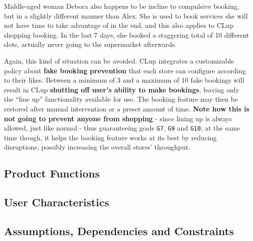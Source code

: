 Middle-aged woman Debora also happens to be incline to \guillemotleft compulsive booking\guillemotright, but in a slightly different manner than Alex. \newline
She is used to book services she will not have time to take advantage of in the end, and this also applies to CLup shopping booking. In the last 7 days, she booked a staggering total of 10 different slots, actually never going to the supermarket afterwards.

Again, this kind of situation can be avoided. CLup integrates a customizable policy about \textbf{fake booking prevention} that each store can configure according to their likes. \newline
Between a minimum of 3 and a maximum of 10 fake bookings will result in CLup \textbf{shutting off user's ability to make bookings}, leaving only the ``line up'' functionality available for use. The booking feature may then be restored after manual intervention or a preset amount of time. \newline
\textbf{Note how this is not going to prevent anyone from shopping} - since lining up is always allowed, just like normal - thus guaranteeing goals \texttt{G7}, \texttt{G9} and \texttt{G10}; at the same time though, it helps the booking feature works at its best by reducing disruptions, possibly increasing the overall stores' throughput.

\subsection{Product Functions}

\subsection{User Characteristics}

\subsection{Assumptions, Dependencies and Constraints}
